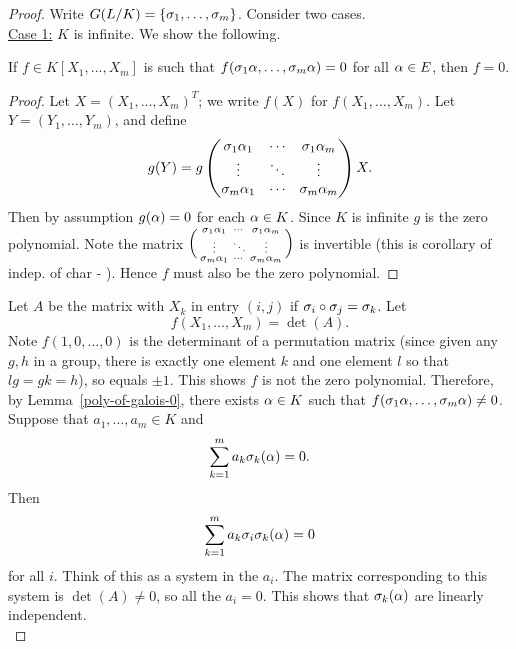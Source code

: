 \begin{proof}
Write $G(L/K)=\{\sigma_1,\ldots,\sigma_m\}$. Consider two cases.\\

\noindent\underline{Case 1:} $K$ is infinite. We show the following.
\begin{lem}\label{poly-of-galois-0}
If $f\in K[X_1,\ldots, X_m]$ is such that $f(\sigma_1\alpha,\ldots,\sigma_m\alpha)=0$ for all $\alpha\in E$, then $f=0$.
\end{lem}
\begin{proof}
Let $X=(X_1,\ldots, X_m)^T$; we write $f(X)$ for $f(X_1,\ldots, X_m)$. Let $Y=(Y_1,\ldots, Y_m)$, and define
\[
g(Y)=
g\begin{pmatrix}\sigma_{1}\alpha_{1} & \cdots & \sigma_{1}\alpha_{m}\\
\vdots & \ddots & \vdots\\
\sigma_{m}\alpha_{1} & \cdots & \sigma_{m}\alpha_{m}
\end{pmatrix}X.
\]
Then by assumption $g(\alpha)=0$ for each $\alpha\in K$. Since $K$ is infinite $g$ is the zero polynomial.   Note the matrix $\left( {\begin{smallmatrix}\sigma_{1}\alpha_{1} & \cdots & \sigma_{1}\alpha_{m}\\
\vdots & \ddots & \vdots\\
\sigma_{m}\alpha_{1} & \cdots & \sigma_{m}\alpha_{m}
\end{smallmatrix}} \right)$ is invertible (this is corollary of indep. of char - ). Hence $f$ must also be the zero polynomial.
\end{proof}
Let $A$ be the matrix with $X_k$ in entry $(i, j)$ if $\sigma_i\circ \sigma_j=\sigma_k$. Let 
\[
f(X_1,\ldots, X_m)=\det(A).
\]
Note $f(1,0,\ldots, 0)$ is the determinant of a permutation matrix (since given any $g,h$ in a group, there is exactly one element $k$ and one element $l$ so that $lg=gk=h$), so equals $\pm1$. This shows $f$ is not the zero polynomial. Therefore, by Lemma~\ref{poly-of-galois-0}, there exists $\alpha\in K$ such that $f(\sigma_1\alpha,\ldots, \sigma_m\alpha)\ne 0$. %
Suppose that $a_1,\ldots, a_m\in K$ and 
\[
\sum_{k=1}^m a_k\sigma_k(\alpha)=0.
\]
Then
\[
\sum_{k=1}^m a_k\sigma_i\sigma_k(\alpha)=0
\]
for all $i$. Think of this as a system in the $a_i$. The matrix corresponding to this system is $\det(A)\ne 0$, so all the $a_i=0$. This shows that $\sigma_k(\alpha)$ are linearly independent.\\


\end{proof}
